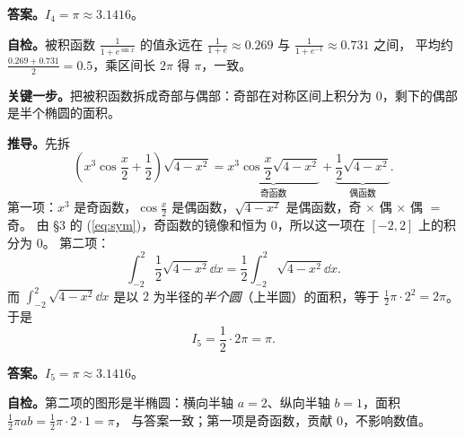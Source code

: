 \documentclass[11pt]{ctexart}
\newcommand{\qhalf}{\needspace{0.50\textheight}}
\begin{document}
\textbf{答案。}$I_4=\pi\approx 3.1416$。

\textbf{自检。}被积函数 $\frac{1}{1+e^{\sin x}}$ 的值永远在 $\frac{1}{1+e}\approx 0.269$ 与 $\frac{1}{1+e^{-1}}\approx 0.731$ 之间，
平均约 $\frac{0.269+0.731}{2}=0.5$，乘区间长 $2\pi$ 得 $\pi$，一致。


\qhalf
{}
\label{sol5}

\textbf{关键一步。}把被积函数拆成奇部与偶部：奇部在对称区间上积分为 $0$，剩下的偶部是半个椭圆的面积。

\textbf{推导。}先拆
\[
\left(x^3\cos\frac{x}{2}+\frac{1}{2}\right)\sqrt{4-x^2}
=\underbrace{x^3\cos\frac{x}{2}\sqrt{4-x^2}}_{\text{奇函数}}
+\underbrace{\frac12\sqrt{4-x^2}}_{\text{偶函数}} .
\]
第一项：$x^3$ 是奇函数，$\cos\frac{x}{2}$ 是偶函数，$\sqrt{4-x^2}$ 是偶函数，奇 $\times$ 偶 $\times$ 偶 $=$ 奇。
由 §3 的 (\ref{eq:sym})，奇函数的镜像和恒为 $0$，所以这一项在 $[-2,2]$ 上的积分为 $0$。
第二项：
\[
\int_{-2}^{2}\frac12\sqrt{4-x^2}\dd x=\frac12\int_{-2}^{2}\sqrt{4-x^2}\dd x .
\]
而 $\int_{-2}^{2}\sqrt{4-x^2}\dd x$ 是以 $2$ 为半径的\emph{半个圆}（上半圆）的面积，等于 $\frac12\pi\cdot 2^2=2\pi$。于是
\[
I_5=\frac12\cdot 2\pi=\pi .
\]

\textbf{答案。}$I_5=\pi\approx 3.1416$。

\textbf{自检。}第二项的图形是半椭圆：横向半轴 $a=2$、纵向半轴 $b=1$，面积 $\frac12\pi ab=\frac12\pi\cdot2\cdot1=\pi$，
与答案一致；第一项是奇函数，贡献 $0$，不影响数值。

\flowerrule

\end{document}
